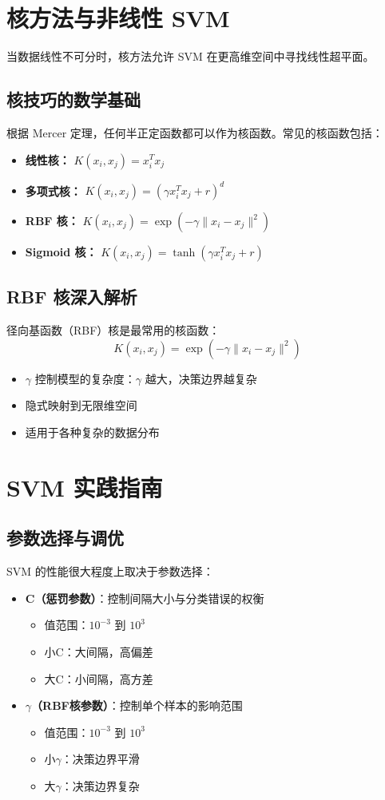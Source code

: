 \documentclass{article}
\begin{document}
\section*{核方法与非线性 SVM}
当数据线性不可分时，核方法允许 SVM 在更高维空间中寻找线性超平面。

\subsection*{核技巧的数学基础}
根据 Mercer 定理，任何半正定函数都可以作为核函数。常见的核函数包括：
\begin{itemize}
    \item \textbf{线性核：} $K(x_i, x_j) = x_i^T x_j$
    \item \textbf{多项式核：} $K(x_i, x_j) = (\gamma x_i^T x_j + r)^d$
    \item \textbf{RBF 核：} $K(x_i, x_j) = \exp(-\gamma \|x_i - x_j\|^2)$
    \item \textbf{Sigmoid 核：} $K(x_i, x_j) = \tanh(\gamma x_i^T x_j + r)$
\end{itemize}

\subsection*{RBF 核深入解析}
径向基函数（RBF）核是最常用的核函数：
$$K(x_i, x_j) = \exp\left(-\gamma \|x_i - x_j\|^2\right)$$
\begin{itemize}
    \item $\gamma$ 控制模型的复杂度：$\gamma$ 越大，决策边界越复杂
    \item 隐式映射到无限维空间
    \item 适用于各种复杂的数据分布
\end{itemize}



\section*{SVM 实践指南}
\subsection*{参数选择与调优}
SVM 的性能很大程度上取决于参数选择：
\begin{itemize}
    \item \textbf{C（惩罚参数）}：控制间隔大小与分类错误的权衡
    \begin{itemize}
        \item 值范围：$10^{-3}$ 到 $10^{3}$
        \item 小C：大间隔，高偏差
        \item 大C：小间隔，高方差
    \end{itemize}
    
    \item \textbf{$\gamma$（RBF核参数）}：控制单个样本的影响范围
    \begin{itemize}
        \item 值范围：$10^{-3}$ 到 $10^{3}$
        \item 小$\gamma$：决策边界平滑
        \item 大$\gamma$：决策边界复杂
    \end{itemize}
\end{itemize}
\end{document}
